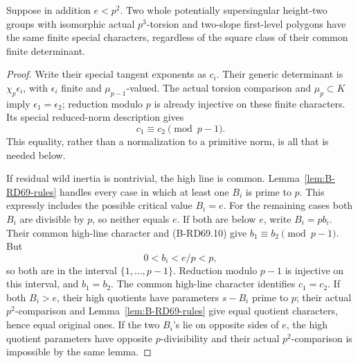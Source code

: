 \begin{proposition}
\label{prop:B-RD69-two-slope}
Suppose in addition \(e<p^2\). Two whole potentially
supersingular height-two groups with isomorphic actual
\(p^3\)-torsion and two-slope first-level polygons have the
same finite special characters, regardless of the square
class of their common finite determinant.
\end{proposition}
\begin{proof}
Write their special tangent exponents as \(c_i\).
Their generic determinant is \(\chi_p\epsilon_i\), with
\(\epsilon_i\) finite and \(\mu_{p-1}\)-valued.
The actual torsion comparison and \(\mu_p\subset K\) imply
\(\epsilon_1=\epsilon_2\); reduction modulo \(p\) is already
injective on these finite characters. Its special reduced-norm
description gives
\[
 c_1\equiv c_2\pmod{p-1}.
 \tag{B-RD69.10}
\]
This equality, rather than a normalization to a primitive norm,
is all that is needed below.

If residual wild inertia is nontrivial, the high line is common.
Lemma~\ref{lem:B-RD69-rules} handles every case in which at
least one \(B_i\) is prime to \(p\). This expressly includes
the possible critical value \(B_i=e\).
For the remaining cases both \(B_i\) are divisible by \(p\),
so neither equals \(e\). If both are below \(e\), write
\(B_i=pb_i\). Their common high-line character and (B-RD69.10)
give \(b_1\equiv b_2\pmod{p-1}\). But
\[
 0<b_i<e/p<p,
 \tag{B-RD69.11}
\]
so both are in the interval \(\{1,\ldots,p-1\}\).
Reduction modulo \(p-1\) is injective on this interval, and
\(b_1=b_2\). The common high-line character identifies \(c_1=c_2\).
If both \(B_i>e\), their high quotients have parameters
\(s-B_i\) prime to \(p\); their actual \(p^2\)-comparison and
Lemma~\ref{lem:B-RD69-rules} give equal quotient characters,
hence equal original ones.
If the two \(B_i\)'s lie on opposite sides of \(e\), the high
quotient parameters have opposite \(p\)-divisibility and their
actual \(p^2\)-comparison is impossible by the same lemma.


\end{proof}
